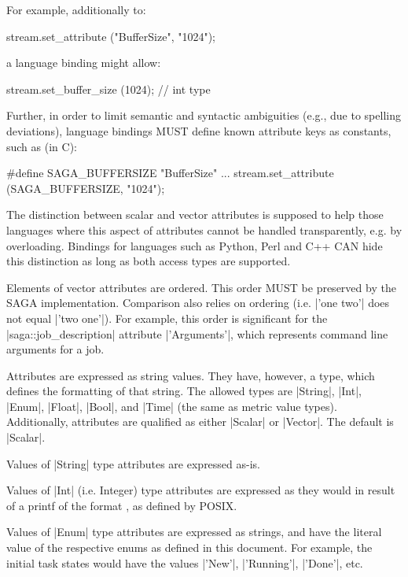   For example, additionally to:
 
  \up
  \begin{myio}
    stream.set_attribute ("BufferSize", "1024");
  \end{myio}
 
  \up
  a language binding might allow:
 
  \up
  \begin{myio}
    stream.set_buffer_size (1024);  // int type
  \end{myio}
 
  \up
  Further, in order to limit semantic and syntactic ambiguities
  (e.g., due to spelling deviations), language bindings MUST
  define known attribute keys as constants, such as (in C):
 
  \up
  \begin{myio}
    #define SAGA_BUFFERSIZE "BufferSize"
    ...
    stream.set_attribute (SAGA_BUFFERSIZE, "1024");
  \end{myio}
  
  \up
  The distinction between scalar and vector attributes is
  supposed to help those
  languages where this aspect of attributes cannot
  be handled transparently, e.g. by overloading.  Bindings for languages
  such as Python, Perl and C++ CAN hide this distinction as long
  as both access types are supported.
 
  Elements of vector attributes are ordered. This order MUST be 
  preserved by the SAGA implementation.
  Comparison also relies on ordering (i.e. |'one two'| does
  not equal |'two one'|).  For example, this order is
  significant for the |saga::job_description| attribute
  |'Arguments'|, which represents command line arguments for a
  job.
 
  Attributes are expressed as string values. They have,
  however, a type, which defines the formatting of that
  string.  The allowed types are |String|, |Int|, |Enum|,
  |Float|, |Bool|, and |Time| (the same as metric value types).
  Additionally, attributes are qualified as either |Scalar| or
  |Vector|.  The default is |Scalar|.
 
  Values of |String| type attributes are expressed as-is.
 
  Values of |Int| (i.e. Integer) type attributes are expressed
  as they would in result of a printf of the format
  , as defined by POSIX.
 
  Values of |Enum| type attributes are expressed as strings, and
  have the literal value of the respective enums as defined in
  this document.  For example, the initial task states would
  have the values |'New'|, |'Running'|, |'Done'|, etc.
 
